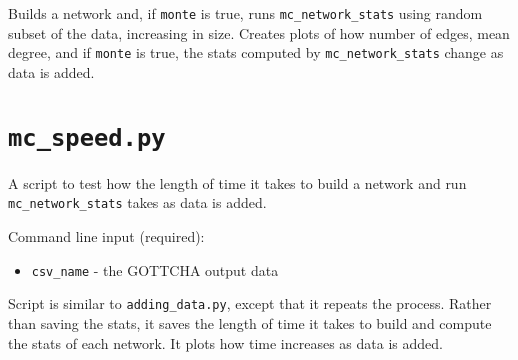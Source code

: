 \documentclass[10pt]{article}
\theoremstyle{definition}
\numberwithin{theorem}{section}
\numberwithin{definition}{section}
\numberwithin{lemma}{section}
\numberwithin{corollary}{section}
\numberwithin{clm}{section}
\numberwithin{rmk}{section}
\begin{document}
Builds a network and, if \verb|monte| is true, runs \verb|mc_network_stats| using random subset of the data, increasing in size. Creates plots of how number of edges, mean degree, and if \verb|monte| is true, the stats computed by \verb|mc_network_stats| change as data is added.

\cprotect \section{\verb|mc_speed.py|}

A script to test how the length of time it takes to build a network and run \verb|mc_network_stats| takes as data is added.

Command line input (required):
\begin{itemize}
	\item \verb|csv_name| - the GOTTCHA output data
\end{itemize}

Script is similar to \verb|adding_data.py|, except that it repeats the process. Rather than saving the stats, it saves the length of time it takes to build and compute the stats of each network. It plots how time increases as data is added.





\end{document}
